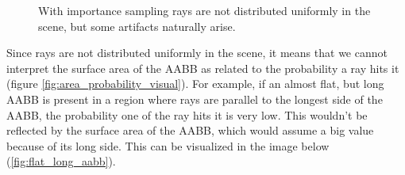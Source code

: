 \documentclass{PoliMi_MasterThesis}
\begin{document}
\begin{figure}[H]
    \centering
	\qquad
    \caption{With importance sampling rays are not distributed uniformly in the scene, but some artifacts naturally arise.}
    \label{fig:non_uniform_rays}
\end{figure}

Since rays are not distributed uniformly in the scene, it means that we cannot interpret the surface area of the AABB as related to the probability a ray hits it (figure \ref{fig:area_probability_visual}). For example, if an almost flat, but long AABB is present in a region where rays are parallel to the longest side of the AABB, the probability one of the ray hits it is very low. This wouldn't be reflected by the surface area of the AABB, which would assume a big value because of its long side. This can be visualized in the image below (\ref{fig:flat_long_aabb}).
\end{document}
